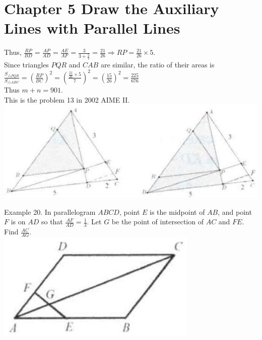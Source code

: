 \documentclass[10pt]{article}
\begin{document}
\section*{Chapter 5 Draw the Auxiliary Lines with Parallel Lines}
Thus, \(\frac{R P}{B D}=\frac{A P}{A D}=\frac{A E}{A F}=\frac{3}{3+\frac{5}{7}}=\frac{21}{26} \Rightarrow R P=\frac{21}{26} \times 5\).\\
Since triangles \(P Q R\) and \(C A B\) are similar, the ratio of their areas is\\
\(\frac{S_{\triangle P Q R}}{S_{\triangle A B C}}=\left(\frac{R P}{B C}\right)^{2}=\left(\frac{\frac{21}{26} \times 5}{7}\right)^{2}=\left(\frac{15}{26}\right)^{2}=\frac{225}{676}\)\\
Thus \(m+n=901\).\\
This is the problem 13 in 2002 AIME II.\\
\includegraphics[max width=\textwidth, center]{2025_04_17_97bc1f7e44d93c271a88g-123(2)}

Example 20. In parallelogram \(A B C D\), point \(E\) is the midpoint of \(A B\), and point \(F\) is on \(A D\) so that \(\frac{A F}{A D}=\frac{1}{3}\). Let \(G\) be the point of intersection of \(A C\) and \(F E\). Find \(\frac{A C}{A G}\).\\
\includegraphics[max width=\textwidth, center]{2025_04_17_97bc1f7e44d93c271a88g-123}
\end{document}
